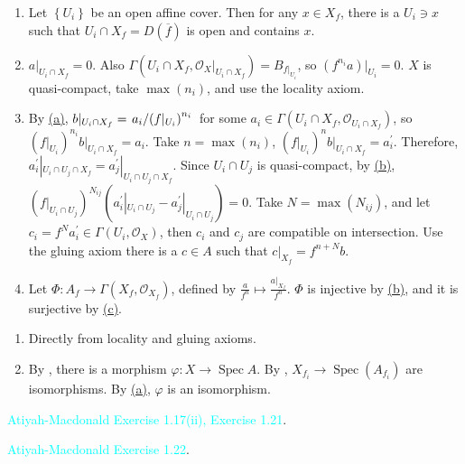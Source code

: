 \begin{exercise}\label{ex2.16}
	\begin{enumerate}[label=(\alph*),ref=\theexercise(\alph*)]
		\item\label{ex2.16.1} Let $\left\{U_i\right\}$ be an open affine cover. Then for any $x\in X_f$, there is a $U_i\ni x$ such that $U_i\cap X_f=D\!\left(\overline{f}\right)$ is open and contains $x$.
		\item\label{ex2.16.2} $a|_{U_i\cap X_f}=0$. Also $\Gamma\!\left(U_i\cap X_f,\mathcal{O}_X|_{U_i\cap X_f}\right)=B_{f|_{U_i}}$, so $\left(f^{n_i}a\right)|_{U_i}=0$. $X$ is quasi-compact, take $\max\!\left(n_i\right)$, and use the locality axiom.
		\item\label{ex2.16.3} By \hyperref[ex2.16.1]{(a)}, $b|_{U_i\cap X_f}=\left.a_i\middle/\left(f|_{U_i}\right)^{n_i}\right.$ for some $a_i\in\Gamma\!\left(U_i\cap X_f,\mathcal{O}_{U_i\cap X_f}\right)$, so $\left(f|_{U_i}\right)^{n_i}b|_{U_i\cap X_f}=a_i$. Take $n=\max\!\left(n_i\right)$, $\left(f|_{U_i}\right)^nb|_{U_i\cap X_f}=a_i^\prime$. Therefore, $a_i^\prime|_{U_i\cap U_j\cap X_f}=a_j^\prime|_{U_i\cap U_j\cap X_f}$. Since $U_i\cap U_j$ is quasi-compact, by \hyperref[ex2.16.2]{(b)}, $\left(f|_{U_i\cap U_j}\right)^{N_{ij}}\left(a_i^\prime|_{U_i\cap U_j}-a_j^\prime|_{U_i\cap U_j}\right)=0$. Take $N=\max\!\left(N_{ij}\right)$, and let $c_i=f^Na_i^\prime\in\Gamma\!\left(U_i,\mathcal{O}_X\right)$, then $c_i$ and $c_j$ are compatible on intersection. Use the gluing axiom there is a $c\in A$ such that $c|_{X_f}=f^{n+N}b$.
		\item\label{ex2.16.4} Let $\Phi:A_f\rightarrow\Gamma\!\left(X_f,\mathcal{O}_{X_f}\right)$, defined by $\frac{a}{f^n}\mapsto \frac{a|_{X_f}}{f^n}$. $\Phi$ is injective by \hyperref[ex2.16.2]{(b)}, and it is surjective by \hyperref[ex2.16.3]{(c)}.
	\end{enumerate}
\end{exercise}

\begin{exercise}\label{ex2.17}
	\begin{enumerate}[label=(\alph*),ref=\theexercise(\alph*)]
		\item\label{ex2.17.1} Directly from locality and gluing axioms.
		\item\label{ex2.17.2} By , there is a morphism $\varphi:X\rightarrow\operatorname{Spec}A$. By , $X_{f_i}\rightarrow\operatorname{Spec}\!\left(A_{f_i}\right)$ are isomorphisms. By \hyperref[ex2.17.1]{(a)}, $\varphi$ is an isomorphism.
	\end{enumerate}
\end{exercise}

\begin{exercise}\label{ex2.18}
	\textcolor{cyan}{Atiyah-Macdonald Exercise 1.17(ii), Exercise 1.21}.
\end{exercise}

\begin{exercise}\label{ex2.19}
	\textcolor{cyan}{Atiyah-Macdonald Exercise 1.22}.
\end{exercise}

